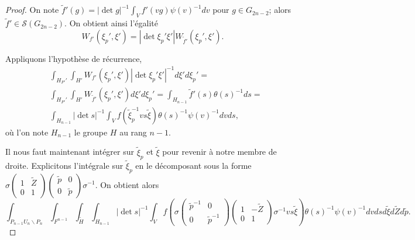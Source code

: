\documentclass{amsart}
\begin{document}
\begin{proof}
On note $\tilde{f}'(g) = |\det g|^{-1}\int_V f'(vg) \psi(v)^{-1} dv$ pour $g \in G_{2n-2}$; alors $\tilde{f}' \in \mathcal{S}(G_{2n-2})$. On obtient ainsi l'égalité
\begin{equation}
W_{f'}(\xi_p', \xi') = |\det \xi_p' \xi'| W_{\tilde{f}'}(\xi_p', \xi').
\end{equation}

Appliquons l'hypothèse de récurrence,
 \begin{equation}
 \begin{split}
 & \int_{H_{P'}'} \int_{H'} W_{f'}(\xi_p', \xi') |\det \xi_p'\xi'|^{-1} d\xi' d\xi_p' = \\
 & \int_{H_{P'}'} \int_{H'} W_{\tilde{f}'}(\xi_p', \xi') d\xi' d\xi_p' = \int_{H_{n-1}} \tilde{f}'(s) \theta(s)^{-1} ds = \\
 & \int_{H_{n-1}} |\det s|^{-1} \int_V f(\tilde{\xi}_p^{-1}v s \tilde{\xi}) \theta(s)^{-1} \psi(v)^{-1} dv ds,
 \end{split}
 \end{equation}
où l'on note $H_{n-1}$ le groupe $H$ au rang $n-1$.

Il nous faut maintenant intégrer sur $\tilde{\xi}_p$ et $\tilde{\xi}$ pour revenir à notre membre de droite. Explicitons l'intégrale sur $\tilde{\xi}_p$ en le décomposant sous la forme $\sigma \begin{pmatrix}
1 & \tilde{Z} \\
0 & 1
\end{pmatrix}\begin{pmatrix}
\tilde{p} & 0 \\
0 & \tilde{p}
\end{pmatrix} \sigma^{-1}$. On obtient alors
\begin{equation}
\int_{P_{n-1}U_n\backslash{P_n}} \int_{F^{n-1}} \int_{\tilde{H}} \int_{H_{n-1}} |\det s|^{-1} \int_V f\left(\sigma \begin{pmatrix}
\tilde{p}^{-1} & 0 \\
0 & \tilde{p}^{-1}
\end{pmatrix} \begin{pmatrix}
1 & -\tilde{Z} \\
0 & 1
\end{pmatrix} \sigma^{-1} v s \tilde{\xi}\right) \theta(s)^{-1} \psi(v)^{-1} dv ds d\tilde{\xi} d\tilde{Z} d\tilde{p}.
\end{equation}


\end{proof}
\end{document}
